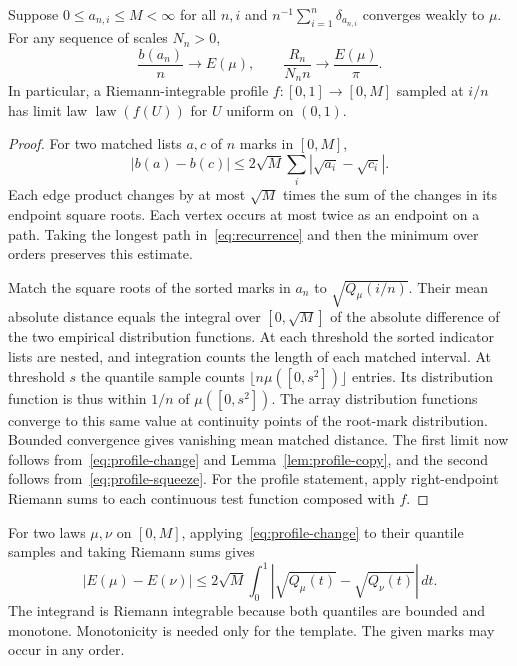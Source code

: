\begin{theorem}\label{thm:profile-law}
Suppose $0\le a_{n,i}\le M<\infty$ for all $n,i$ and
$n^{-1}\sum_{i=1}^n\delta_{a_{n,i}}$ converges weakly to $\mu$.
For any sequence of scales $N_n>0$,
\[
 \frac{b(a_n)}{n}\longrightarrow E(\mu),\qquad
 \frac{R_n}{N_n n}\longrightarrow\frac{E(\mu)}{\pi}.
\]
In particular, a Riemann-integrable profile $f:[0,1]\to[0,M]$ sampled
at $i/n$ has limit law $\operatorname{law}(f(U))$ for $U$ uniform on $(0,1)$.
\end{theorem}
\begin{proof}
For two matched lists $a,c$ of $n$ marks in $[0,M]$,
\begin{equation}\label{eq:profile-change}
 |b(a)-b(c)|\le2\sqrt M\sum_i|\sqrt{a_i}-\sqrt{c_i}|.
\end{equation}
Each edge product changes by at most $\sqrt M$ times the sum of the
changes in its endpoint square roots. Each vertex occurs at most twice
as an endpoint on a path. Taking the longest path
in~\eqref{eq:recurrence} and then the minimum over orders preserves
this estimate.

Match the square roots of the sorted marks in $a_n$ to
$\sqrt{Q_\mu(i/n)}$. Their mean absolute distance equals the integral
over $[0,\sqrt M]$ of the absolute difference of the two empirical
distribution functions. At each threshold the sorted indicator lists
are nested, and integration counts the length of each matched interval.
At threshold $s$ the quantile sample counts $\lfloor n\mu([0,s^2])\rfloor$
entries. Its distribution function is thus within $1/n$ of
$\mu([0,s^2])$. The array distribution functions converge to this same
value at continuity points of the root-mark distribution. Bounded
convergence gives vanishing mean matched distance. The first limit now
follows from~\eqref{eq:profile-change} and Lemma~\ref{lem:profile-copy},
and the second follows from~\eqref{eq:profile-squeeze}. For the profile
statement, apply right-endpoint Riemann sums to each continuous test
function composed with $f$.
\end{proof}

For two laws $\mu,\nu$ on $[0,M]$, applying~\eqref{eq:profile-change}
to their quantile samples and taking Riemann sums gives
\[
 |E(\mu)-E(\nu)|\le2\sqrt M
 \int_0^1|\sqrt{Q_\mu(t)}-\sqrt{Q_\nu(t)}|\,dt.
\]
The integrand is Riemann integrable because both quantiles are bounded
and monotone. Monotonicity is needed only for the template. The given
marks may occur in any order.

